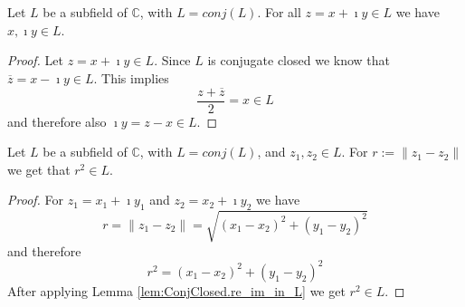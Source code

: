 \begin{lemma}
    \label{lem:ConjClosed.re_im_in_L}
    \leanok
    Let $L$ be a subfield of $\mathbb{C}$, with $L = conj(L)$. For all $z = x + \imath y \in L$ we have $x, \imath y \in L$.
\end{lemma}
\begin{proof}
    Let $z = x + \imath y \in L$. Since $L$ is conjugate closed we know that $\overline{z}=x-\imath y \in L$. This implies
    \begin{equation*}
        \frac{z + \overline{z}}{2} = x \in L
    \end{equation*}
    and therefore also $\imath y = z - x \in L$.
\end{proof}


\begin{lemma}
    \label{lem:ConjClosed.distSq_L}
    \leanok
    Let $L$ be a subfield of $\mathbb{C}$, with $L = conj(L)$, and $z_1, z_2 \in L$.
    For $r := \|z_1-z_2\|$ we get that $r^2 \in L$.
\end{lemma}
\begin{proof}
    For $z_1 = x_1 + \imath y_1$ and $z_2 = x_2 + \imath y_2$ we have
    \begin{equation*}
        r = \|z_1 - z_2\| = \sqrt{(x_1 - x_2)^2 + (y_1 - y_2)^2}
    \end{equation*}
    and therefore
    \begin{equation*}
        r^2 = (x_1 - x_2)^2 + (y_1 - y_2)^2 
    \end{equation*}
    After applying Lemma \ref{lem:ConjClosed.re_im_in_L} we get $r^2 \in L$.
\end{proof}

